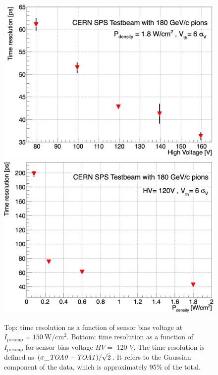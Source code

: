 		\vspace{5pt}
		\begin{figure}[h]
			\centering %
			\includegraphics[width=.65\textwidth,trim=0 0 0 0, clip]{files/ATTRACT_paper/timeres_vs_HV}
			\vspace{10pt}
			\includegraphics[width=.65\textwidth,trim=0 0 0 0, clip]{files/ATTRACT_paper/timeres_vs_power}
			\caption{Top: time resolution as a function of sensor bias voltage at $ I_{\text{preamp}} = \SI{150}{\watt/\centi\meter^2}$. Bottom: time resolution as a function of $I_{\text{preamp}} $ for sensor bias voltage $HV = $ 120 $V$. The time resolution is defined as $(\sigma\_{\it TOA0-TOA1})/\sqrt{2}$. It refers to the Gaussian component of the data, which is approximately 95\% of the total.}
			\label{im:ATTRACT_TOFHV} 
		\end{figure}
		
		
		
		
		
		
		
		
		
		
		
		
		
		
		
		
		
		
		
		
		
